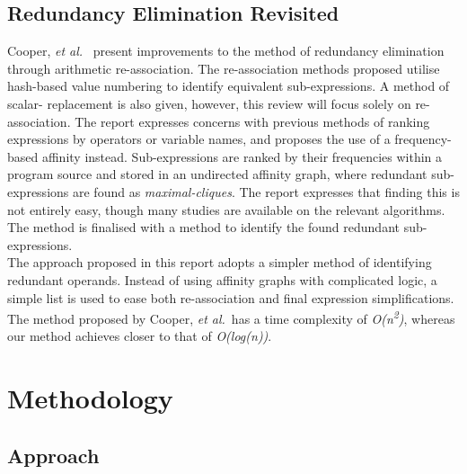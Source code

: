\documentclass[12pt,openany,a4paper]{book}
\begin{document}
\section{Redundancy Elimination Revisited}
\label{litrev3}

Cooper, \emph{et al.}~\cite{redund} present improvements to the method of redundancy elimination through
arithmetic re-association. The re-association methods proposed utilise hash-based
value numbering to identify equivalent sub-expressions. A method of scalar-
replacement is also given, however, this review will focus solely on re-association.
The report expresses concerns with previous methods of ranking expressions 
by operators or variable names, and proposes the use of a frequency-based affinity
instead. Sub-expressions are ranked by their frequencies within a program source and
stored in an undirected affinity graph, where redundant sub-expressions are found
as \emph{maximal-cliques}. The report expresses that finding this is not
entirely easy, though many studies are available on the relevant algorithms.
The method is finalised with a method to identify the found redundant sub-expressions.\\
The approach proposed in this report adopts a simpler method of identifying
redundant operands. Instead of using affinity graphs with complicated logic,
a simple list is used to ease both re-association and final expression
simplifications. The method proposed by Cooper, \emph{et al.}\ has a time complexity
of \emph{O(n\textsuperscript{2})}, whereas our method achieves closer to that of
\emph{O(log(n))}.

\chapter{Methodology}
\label{methods}

\section{Approach}
\label{approach}
\end{document}
